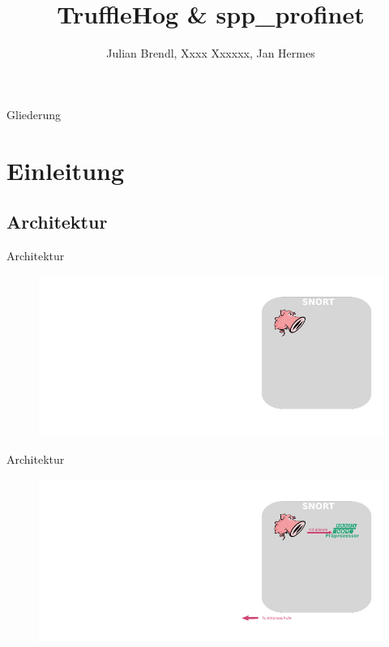 \documentclass[18pt]{beamer}
\title[TruffleHog \& spp\_profinet]{TruffleHog \& spp\_profinet}
\author{Julian Brendl, Xxxx Xxxxxx, Jan Hermes}
\institute{Fraunhofer IOSB}
\begin{document}

\begin{frame}
\titlepage
\end{frame}

\begin{frame}{Gliederung}
\tableofcontents
\end{frame}

\section{Einleitung}
\subsection{Architektur}
\begin{frame}{Architektur}
    \begin{figure}
    	\centering
    	\includegraphics[width=\textwidth]{./images/1.pdf}
    \end{figure}
\end{frame}

\begin{frame}{Architektur}
    \begin{figure}
    	\centering
    	\includegraphics[width=\textwidth]{./images/2.pdf}
    \end{figure}
\end{frame}
\end{document}
